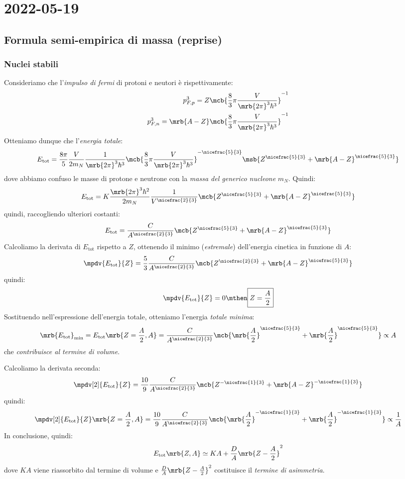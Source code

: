 \chapter{2022-05-19}
\section{Formula semi-empirica di massa (reprise)}
\subsection{Nuclei stabili}
Consideriamo che l'\textit{impulso di fermi} di protoni e neutori è
rispettivamente:
\begin{align*}
  p _{F,p}^{3} = Z \mcb{\frac{8}{3} \pi \frac{V}{\mrb{2 \pi}^{3}
  \hbar^3}}^{-1}
  \\
  p _{F,n}^{3} = \mrb{A - Z} \mcb{\frac{8}{3} \pi \frac{V}{\mrb{2 \pi}^{3}
  \hbar^3}}^{-1}
\end{align*}
Otteniamo dunque che l'\textit{energia totale}:
\[
  E _\text{tot} = \frac{8 \pi}{5} \frac{V}{2 m_N} \frac{1}{\mrb{2 \pi}^{3}
  \hbar^3} \mcb{\frac{8}{3} \pi \frac{V}{\mrb{2 \pi}^{3}
  \hbar^3}}^{-\nicefrac{5}{3}} \msb{Z ^{\nicefrac{5}{3}} + \mrb{A - Z}
  ^{\nicefrac{5}{3}}}
\]
dove abbiamo confuso le masse di protone e neutrone con la \textit{massa del
generico nucleone} $m_N$. Quindi:
\[
  E _\text{tot} = K \frac{\mrb{2 \pi}^{3} \hbar^2}{2 m_N} \frac{1}{V
  ^{\nicefrac{2}{3}}} \mcb{Z ^{\nicefrac{5}{3}} + \mrb{A -
  Z}^{\nicefrac{5}{3}}}
\]
quindi, raccogliendo ulteriori costanti:
\[
  E_\text{tot} = \frac{C}{A ^{\nicefrac{2}{3}}} \mcb{Z ^{\nicefrac{5}{3}} +
  \mrb{A - Z}^{\nicefrac{5}{3}}}
\]
Calcoliamo la derivata di $E _\text{tot}$ rispetto a $Z$, ottenendo il minimo
(\textit{estremale}) dell'energia cinetica in funzione di $A$:
\[
  \mpdv{E _\text{tot}}{Z} = \frac{5}{3} \frac{C}{A ^{\nicefrac{2}{3}}} \mcb{Z
  ^{\nicefrac{2}{3}} + \mrb{A - Z}^{\nicefrac{5}{3}}}
\]
quindi:
\[
  \mpdv{E _\text{tot}}{Z} = 0
  \mthen
  \boxed{
    Z = \frac{A}{2}
  }
\]
Sostituendo nell'espressione dell'energia totale, otteniamo l'energia
\textit{totale minima}:
\[
  \mrb{E _\text{tot}}_\text{min} = E _\text{tot} \mrb{Z = \frac{A}{2}, A} =
  \frac{C}{A ^{\nicefrac{2}{3}}} \mcb{\mrb{\frac{A}{2}}^{\nicefrac{5}{3}} +
  \mrb{\frac{A}{2}} ^{\nicefrac{5}{3}}} \propto A
\]
che \textit{contribuisce al termine di volume}.

Calcoliamo la derivata seconda:
\[
  \mpdv[2]{E _\text{tot}}{Z} = \frac{10}{9} \frac{C}{A ^{\nicefrac{2}{3}}}
  \mcb{Z ^{-\nicefrac{1}{3}} + \mrb{A - Z}^{-\nicefrac{1}{3}}}
\]
quindi:
\[
  \mpdv[2]{E _\text{tot}}{Z} \mrb{Z = \frac{A}{2}, A} =  \frac{10}{9}
  \frac{C}{A ^{\nicefrac{2}{3}}} \mcb{\mrb{\frac{A}{2}}^{-\nicefrac{1}{3}} +
  \mrb{\frac{A}{2}}^{-\nicefrac{1}{3}}} \propto \frac{1}{A}
\]
In conclusione, quindi:
\[
  E _\text{tot} \mrb{Z, A} \simeq KA + \frac{D}{A} \mrb{Z - \frac{A}{2}}^{2}
\]
dove $KA$ viene riassorbito dal termine di volume e $\frac{D}{A} \mrb{Z -
\frac{A}{2}}^{2}$ costituisce il \textit{termine di asimmetria}.

